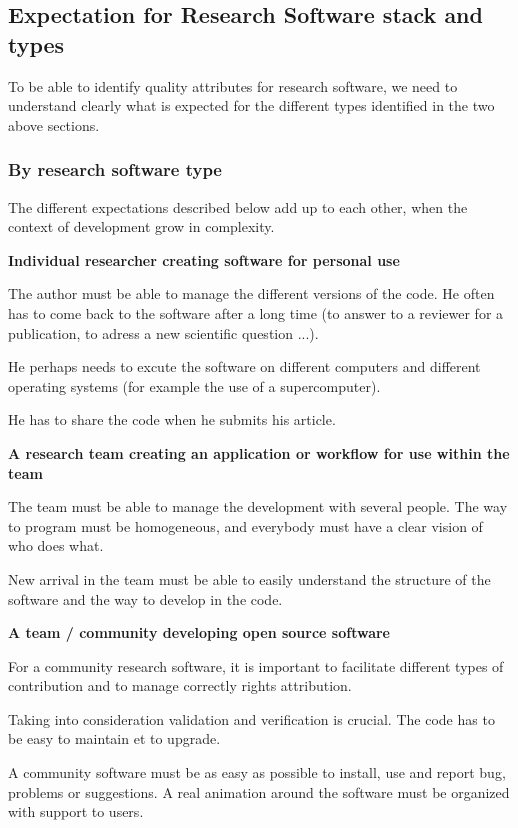 \subsection{Expectation for Research Software stack and types}

To be able to identify quality attributes for research
software, we need to understand clearly what is expected for the
different types identified in the two above sections.

\subsubsection{By research software type}

The different expectations described below add up to each other, when
the context of development grow in complexity.

\textbf{Individual researcher creating software for personal use}

The author must be able to manage the different versions of the
code. He often has to come back to the software after a long time (to
answer to a reviewer for a publication, to adress a new scientific
question ...).

He perhaps needs to excute the software on different computers and
different operating systems (for example the use of a supercomputer).

He has to share the code when he submits his article.

\textbf{A research team creating an application or workflow for use
  within the team}

The team must be able to manage the development with several
people. The way to program must be homogeneous, and everybody must
have a clear vision of who does what.

New arrival in the team must be able to easily understand the
structure of the software and the way to develop in the code.

\textbf{A team / community developing open source software}

For a community research software, it is important to facilitate
different types of contribution and to manage correctly rights
attribution.

Taking into consideration validation and verification is crucial. The
code has to be easy to maintain et to upgrade.

A community software must be as easy as possible to install, use and report
bug, problems or suggestions.
A real animation around the software must be organized with support to users.

